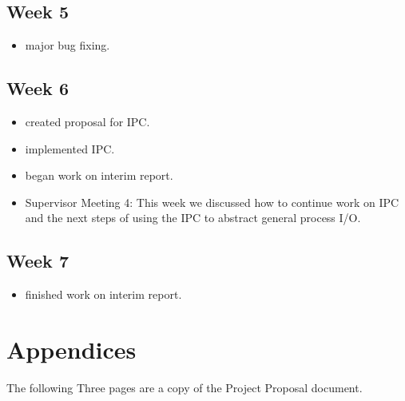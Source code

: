 \documentclass[a4paper]{report}
\begin{document}
\section{Week 5}
\begin{itemize}
\item major bug fixing.
\end{itemize}

\section{Week 6}
\begin{itemize}
\item created proposal for IPC.
\item implemented IPC.
\item began work on interim report.
\item Supervisor Meeting 4: This week we discussed how to continue work on IPC and the next steps of using the IPC to abstract general process I/O.
\end{itemize}

\section{Week 7}
\begin{itemize}
\item finished work on interim report.
\end{itemize}

\chapter{Appendices}

The following Three pages are a copy of the Project Proposal document.








\end{document}
